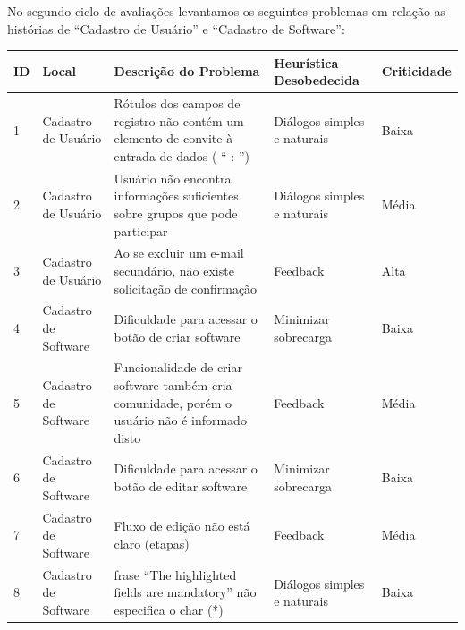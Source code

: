 \newpage
No segundo ciclo de avaliações levantamos os seguintes problemas em relação as histórias de ``Cadastro de Usuário'' e ``Cadastro de Software'':

\begin{table}[h!]
\begin{tabular}{|l|p{3cm}|p{6cm}|p{3cm}|l|}
\hline
\textbf{ID} & \textbf{Local} & \textbf{Descrição do Problema}                                                                                     & \textbf{Heurística Desobedecida} & \textbf{Criticidade} \\ \hline
1           & Cadastro de Usuário                 & Rótulos dos campos de registro não contém um elemento de convite à entrada de dados ( “ : ”) & Diálogos simples e naturais     & Baixa                \\ \hline
2           & Cadastro de Usuário                 & Usuário não encontra informações suficientes sobre grupos que pode participar  & Diálogos simples e naturais             & Média                \\ \hline
3           & Cadastro de Usuário               & Ao se excluir um e-mail secundário, não existe solicitação de confirmação       & Feedback                & Alta                \\ \hline
4           & Cadastro de Software      & Dificuldade para acessar o botão de criar software
	        & Minimizar sobrecarga          & Baixa                \\ \hline
5           & Cadastro de Software       & Funcionalidade de criar software também cria comunidade, porém o usuário não é informado disto  & Feedback    & Média                \\ \hline
6           & Cadastro de Software    & Dificuldade para acessar o botão de editar software
		    & Minimizar sobrecarga           & Baixa                \\ \hline
7           & Cadastro de Software    & Fluxo de edição não está claro (etapas)
			& Feedback                       & Média                \\ \hline
8           & Cadastro de Software    & frase ``The highlighted fields are mandatory'' não especifica o char (*)
		    &Diálogos simples e naturais     & Baixa                \\ \hline
\end{tabular}
\end{table}

 

\newpage


